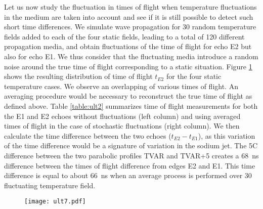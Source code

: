                 Let us now study the fluctuation in times of flight when temperature fluctuations in the medium are taken into account and see if it is still
possible to detect such short time differences. We simulate wave propagation for \num{30} random temperature fields added to each of the four static fields,
leading to a total of \num{120} different propagation media, and obtain fluctuations of the time of flight for echo E2 but also for echo E1. We thus consider
that the fluctuating media introduce a random noise around the true time of flight corresponding to a static situation. Figure \ref{fig:ult7} shows the
resulting distribution of time of flight $t_{E2}$ for the four static temperature cases. We observe an overlapping of various times of flight. An averaging
procedure would be necessary to reconstruct the true time of flight as defined above. Table \ref{table:ult2} summarizes time of flight measurements for both
the E1 and E2 echoes without fluctuations (left column) and using averaged times of flight in the case of stochastic fluctuations (right column). We then
calculate the time difference between the two echoes ($t_{E2} - t_{E1}$), as this variation of the time difference would be a signature of variation in the
sodium jet. The \num{5}\textdegree{}C difference between the two parabolic profiles TVAR and TVAR+5 creates a \SI{68}{\nano\second} difference between the
times of flight difference from edges E2 and E1. This time difference is equal to about \SI{66}{\nano\second} when an average process is performed over
\num{30} fluctuating temperature field.

                \begin{figure}[htbp]
                        \centerline{\texttt{[image: ult7.pdf]}}
                    \label{fig:ult7}
                \end{figure}

